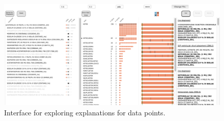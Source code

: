 \begin{figure}[b!]
\centering
\includegraphics[width=0.8\linewidth]{figs/current/paolo_explain}
\caption{
Interface for exploring explanations for data points.
}
\label{figs:paolo_explain}
\end{figure}